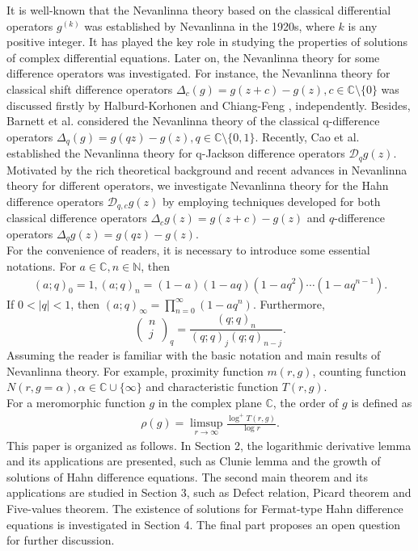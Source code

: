 \documentclass[sn-mathphys-num]{sn-jnl}%
\theoremstyle{thmstyleone}%
\theoremstyle{thmstyletwo}%
\theoremstyle{thmstylethree}%
\begin{document}
\indent It is well-known that the Nevanlinna theory based on the classical differential operators \(g^{(k)}\) was established by Nevanlinna in the 1920s, where \(k\) is any positive integer. It has played the key role in studying the properties of solutions of complex differential equations. Later on, the Nevanlinna theory for some difference operators was investigated. For instance, the Nevanlinna theory for classical shift difference operators $\Delta_{c}(g)=g(z+c)-g(z), c\in\mathbb{C}\setminus\{0\}$ was discussed firstly by Halburd-Korhonen \cite{HK1, HK2} and Chiang-Feng \cite{CF1,CF2}, independently. Besides, Barnett et al. \cite{BH} considered the Nevanlinna theory of the classical q-difference operators $\Delta_{q}(g)=g(qz)-g(z), q\in\mathbb{C}\setminus\{0,1\}$. Recently, Cao et al. \cite{CD} established the Nevanlinna theory for q-Jackson difference operators \(\mathcal{D}_{q}g(z)\). Motivated by the rich theoretical background and recent advances in Nevanlinna theory for different operators, we investigate Nevanlinna theory for the Hahn difference operators \(\mathcal{D}_{q,c}g(z)\) by employing techniques developed for both classical difference operators $\Delta_{c}g(z) = g(z+c)-g(z)$ and $q$-difference operators $\Delta_{q}g(z) = g(qz)-g(z)$.\\
\indent For the convenience of readers, it is necessary to introduce some essential notations. For $a\in\mathbb{C},n\in\mathbb{N}$, then
\begin{align*}
	(a;q)_{0}=1,(a;q)_{n}=(1-a)(1-aq)(1-aq^{2})\cdots(1-aq^{n-1}).
\end{align*}
If $0<|q|<1$, then $(a;q)_{\infty}=\prod_{n=0}^{\infty}(1-aq^{n})$. Furthermore,
\[
\begin{pmatrix}
	n \\
	j
\end{pmatrix}_{q}=\frac{(q;q)_{n}}{(q;q)_{j}(q;q)_{n-j}}.
\]
\indent Assuming the reader is familiar with the basic notation and main results of Nevanlinna theory. For example, proximity function $m(r,g)$, counting function $N(r,g=\alpha), \alpha\in\mathbb{C}\cup\{\infty\}$ and characteristic function $T(r,g)$. \\
\indent For a meromorphic function \(g\) in the complex plane \(\mathbb{C}\), the order of  \(g\) is defined as
\begin{align*}
	\rho(g)=\limsup\limits_{r\to\infty}\frac{\log^{+}T(r,g)}{\log r}.
\end{align*}
\indent This paper is organized as follows. In Section 2, the logarithmic derivative lemma and its applications are presented, such as Clunie lemma and the growth of solutions of Hahn difference equations. The second main theorem and its applications are studied in Section 3, such as Defect relation, Picard theorem and Five-values theorem. The existence of solutions for Fermat-type Hahn difference equations is investigated in Section 4. The final part proposes an open question for further discussion.
\end{document}
